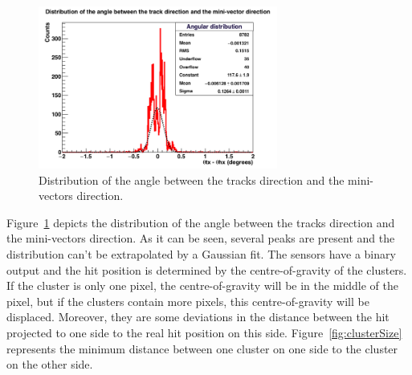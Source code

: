    \begin{figure}[!h]
     \centering
     \includegraphics[width = 0.7\textwidth]{Pictures/deformation/hDiffAngleX_226056.png}
     \caption{Distribution of the angle between the tracks direction and the mini-vectors direction.}
     \label{fig:angRes}
   \end{figure}

   Figure~\ref{fig:angRes} depicts the distribution of the angle between the tracks direction and the mini-vectors direction.
   As it can be seen, several peaks are present and the distribution can't be extrapolated by a Gaussian fit.
   The sensors have a binary output and the hit position is determined by the centre-of-gravity of the clusters.
   If the cluster is only one pixel, the centre-of-gravity will be in the middle of the pixel, but if the clusters contain more pixels, this centre-of-gravity will be displaced.
   Moreover, they are some deviations in the distance between the hit projected to one side to the real hit position on this side.
   Figure~\ref{fig:clusterSize} represents the minimum distance between one cluster on one side to the cluster on the other side.
   
